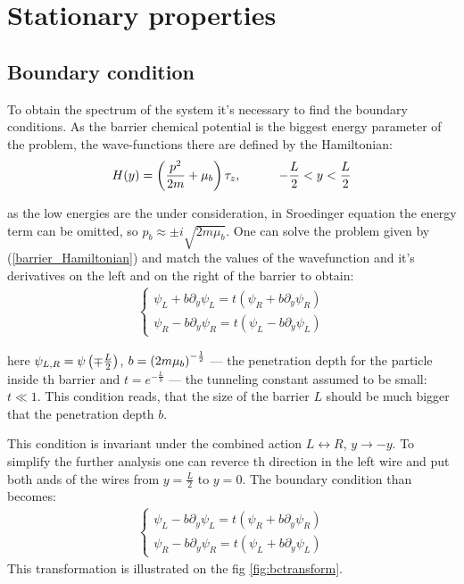 \chapter{Stationary properties} 


\section{Boundary condition}

To obtain the spectrum of the system it's necessary to find the boundary conditions. As the barrier chemical potential  is the biggest energy parameter of the problem, the wave-functions there are defined by the Hamiltonian:
\begin{gather}
\label{barrier_Hamiltonian}
	H(y)
	=
	\left(
		\frac{p^2}{2m}
		+\mu_b
	\right)\tau_z,  ~~~~~~~~~-\frac{L}{2}<y<\frac{L}{2}
\end{gather} 

as the low energies are the under consideration, in Sroedinger equation the energy term can be omitted, so $ p_b\approx\pm i \sqrt{2m\mu_b} $. One can solve the problem given by (\ref{barrier_Hamiltonian}) and match the values of the wavefunction and it's derivatives on the left and on the right of the barrier to obtain:
\begin{gather}
	\begin{cases}
	\psi_L + b\partial_y\psi_L=t(\psi_R + b\partial_y\psi_R) \\
	\psi_R - b\partial_y\psi_R=t(\psi_L - b\partial_y\psi_L)
	\end{cases}
\end{gather}

here $ \psi_{L,R}=\psi\left(\mp\frac{L}{2}\right) $, $ b=\left({2m\mu_b}\right)^{-\frac{1}{2}} $ --- the penetration depth for the particle inside th barrier and $ t = e^{-\frac{L}{b} }$ --- the tunneling constant assumed to be small: $ t\ll 1 $. This condition reads, that the size of the barrier $ L $ should be  much bigger that the penetration depth $ b $.

This condition is invariant under the combined action $ L\leftrightarrow R $, $ y\to-y $. To simplify the further analysis one can reverce th direction in the left wire and put both ands of the wires from $ y= \frac{L}{2} $ to $ y=0 $. The boundary condition than becomes:
\begin{gather}
\label{bc_transformed}
\begin{cases}
\psi_L - b\partial_y\psi_L=t(\psi_R + b\partial_y\psi_R) \\
\psi_R - b\partial_y\psi_R=t(\psi_L + b\partial_y\psi_L)
\end{cases}
\end{gather}
This transformation is illustrated on the fig \ref{fig:bctransform}.

